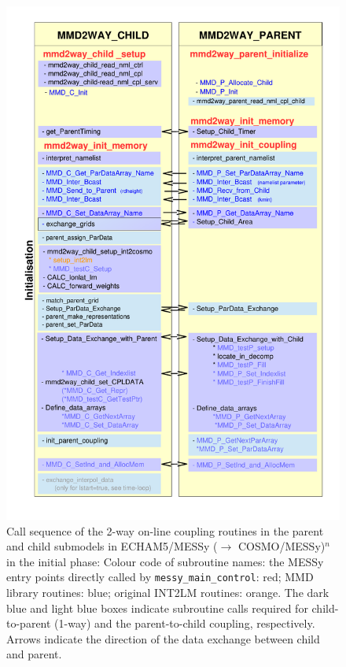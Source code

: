 \documentclass[11pt,twoside]{article}
\begin{document}
\begin{figure}
\begin{center} 
\vspace{-.3cm}
\includegraphics[height=0.9\textheight]{MMDUM_flowchart_iniphase.pdf} 
\end{center} 
\vspace{-.8cm}
\caption{Call sequence of the 2-way on-line coupling routines in the
parent and child submodels in 
ECHAM5/MESSy ($\rightarrow$ COSMO/MESSy)$^n$ in the initial phase:
 Colour code of subroutine names:  the MESSy entry points directly called by
 {\tt messy\_main\_control}: red; MMD library routines: blue; original
 INT2LM routines: orange. The dark blue and light blue boxes indicate
 subroutine calls required for child-to-parent (1-way) and
 the parent-to-child coupling, respectively.
 Arrows indicate the direction of the data exchange between child and parent.} 
\label{fig:call_tree_ini} 
\end{figure} 
\end{document}
